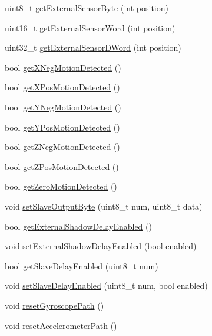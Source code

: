 \begin{DoxyCompactItemize}
\item 
uint8\+\_\+t \hyperlink{class_m_p_u6050_a7f786ab4264f40e5a95e8937ec9adcc2}{get\+External\+Sensor\+Byte} (int position)
\item 
uint16\+\_\+t \hyperlink{class_m_p_u6050_aaee15e48af7ba78660b5754f3bb5f37a}{get\+External\+Sensor\+Word} (int position)
\item 
uint32\+\_\+t \hyperlink{class_m_p_u6050_afd8983f0911e37015434bebc85185fb2}{get\+External\+Sensor\+D\+Word} (int position)
\item 
bool \hyperlink{class_m_p_u6050_a446d235905783c5b90637a6b6792ac76}{get\+X\+Neg\+Motion\+Detected} ()
\item 
bool \hyperlink{class_m_p_u6050_a410af58f5ff5f74e4ef8d61495908226}{get\+X\+Pos\+Motion\+Detected} ()
\item 
bool \hyperlink{class_m_p_u6050_a6c45be7b4aa9081c83ee0f4081bf0827}{get\+Y\+Neg\+Motion\+Detected} ()
\item 
bool \hyperlink{class_m_p_u6050_ad959ec84b9fe9f7e416b7af252f37abc}{get\+Y\+Pos\+Motion\+Detected} ()
\item 
bool \hyperlink{class_m_p_u6050_a3601b732eb15644212b8f29cf396e142}{get\+Z\+Neg\+Motion\+Detected} ()
\item 
bool \hyperlink{class_m_p_u6050_a33c766cd415fc5780417b1ed76717875}{get\+Z\+Pos\+Motion\+Detected} ()
\item 
bool \hyperlink{class_m_p_u6050_a384765351b5c4bd2b6efec9ed71ad1b7}{get\+Zero\+Motion\+Detected} ()
\item 
void \hyperlink{class_m_p_u6050_a34a1def575f6abcd464afe954de8a461}{set\+Slave\+Output\+Byte} (uint8\+\_\+t num, uint8\+\_\+t data)
\item 
bool \hyperlink{class_m_p_u6050_a0e5cb13838298609b5260fd1558f8c92}{get\+External\+Shadow\+Delay\+Enabled} ()
\item 
void \hyperlink{class_m_p_u6050_a9160193d883871037c6535a9d3e02ee2}{set\+External\+Shadow\+Delay\+Enabled} (bool enabled)
\item 
bool \hyperlink{class_m_p_u6050_ae84fd795630f9ab5e8d6b19a616a11ce}{get\+Slave\+Delay\+Enabled} (uint8\+\_\+t num)
\item 
void \hyperlink{class_m_p_u6050_a471929d7cf9049357c345633d22412a9}{set\+Slave\+Delay\+Enabled} (uint8\+\_\+t num, bool enabled)
\item 
void \hyperlink{class_m_p_u6050_af1599c0d70f07fd3e28683d571842c22}{reset\+Gyroscope\+Path} ()
\item 
void \hyperlink{class_m_p_u6050_a99ee74708c12f32e48ef5ec69ac9f4a9}{reset\+Accelerometer\+Path} ()

\end{DoxyCompactItemize}
